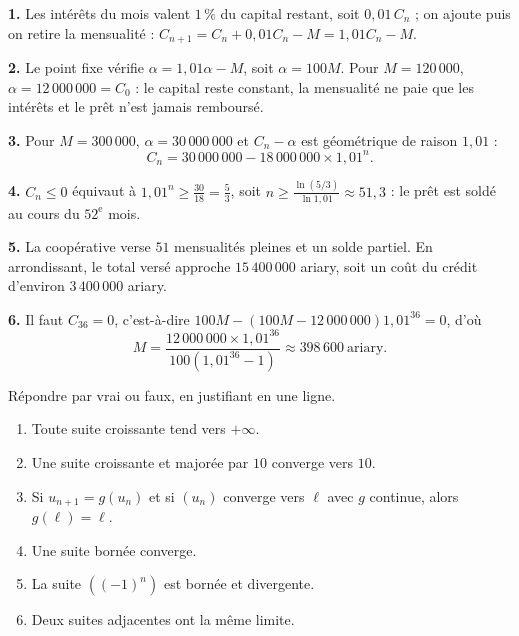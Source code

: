 \begin{corrige}
\textbf{1.} Les intérêts du mois valent $1\,\%$ du capital restant, soit
$0{,}01\,C_{n}$ ; on ajoute puis on retire la mensualité :
$C_{n+1} = C_{n}+0{,}01C_{n}-M = 1{,}01C_{n}-M$.

\textbf{2.} Le point fixe vérifie $\alpha = 1{,}01\alpha-M$, soit
$\alpha = 100M$. Pour $M = 120\,000$, $\alpha = 12\,000\,000 = C_{0}$ : le
capital reste constant, la mensualité ne paie que les intérêts et le prêt
n'est jamais remboursé.

\textbf{3.} Pour $M = 300\,000$, $\alpha = 30\,000\,000$ et
$C_{n}-\alpha$ est géométrique de raison $1{,}01$ :
\[
  C_{n} = 30\,000\,000-18\,000\,000\times1{,}01^{n}.
\]

\textbf{4.} $C_{n} \leq 0$ équivaut à
$1{,}01^{n} \geq \frac{30}{18} = \frac53$, soit
$n \geq \frac{\ln(5/3)}{\ln1{,}01} \approx 51{,}3$ : le prêt est soldé au
cours du $52^{\text{e}}$ mois.

\textbf{5.} La coopérative verse $51$ mensualités pleines et un solde partiel.
En arrondissant, le total versé approche $15\,400\,000$ ariary, soit un coût
du crédit d'environ $3\,400\,000$ ariary.

\textbf{6.} Il faut $C_{36} = 0$, c'est-à-dire
$100M-\left(100M-12\,000\,000\right)1{,}01^{36} = 0$, d'où
\[
  M = \frac{12\,000\,000 \times 1{,}01^{36}}{100\left(1{,}01^{36}-1\right)}
  \approx 398\,600 \ \text{ariary}.
\]
\end{corrige}

\begin{jemeteste}
Répondre par vrai ou faux, en justifiant en une ligne.

\begin{enumerate}[label=\textbf{\arabic*.}, leftmargin=*, itemsep=0.28em]
  \item Toute suite croissante tend vers $+\infty$.
  \item Une suite croissante et majorée par $10$ converge vers $10$.
  \item Si $u_{n+1} = g(u_{n})$ et si $(u_{n})$ converge vers $\ell$ avec $g$
        continue, alors $g(\ell) = \ell$.
  \item Une suite bornée converge.
  \item La suite $\left((-1)^{n}\right)$ est bornée et divergente.
  \item Deux suites adjacentes ont la même limite.
\end{enumerate}
\end{jemeteste}

